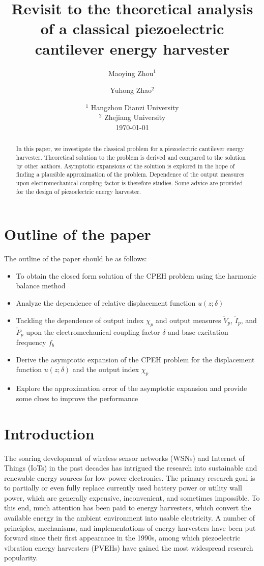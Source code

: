 \documentclass{article}
\title{Revisit to the theoretical analysis of a classical piezoelectric cantilever energy harvester}
\author{Maoying Zhou$^1$ \and Yuhong Zhao$^2$}
\date{%
    $^1$ Hangzhou Dianzi University\\%
    $^2$ Zhejiang University\\[2ex]%
    \today
}
\begin{document}
\maketitle


\begin{abstract}
 In this paper, we investigate the classical problem for a piezoelectric cantilever energy harvester. Theoretical solution to the problem is derived and compared to the solution by other authors. Asymptotic expansions of the solution is explored in the hope of finding a plausible approximation of the problem. Dependence of the output measures upon electromechanical coupling factor is therefore studies. Some advice are provided for the design of piezoelectric energy harvester.
\end{abstract}

\section{Outline of the paper}
The outline of the paper should be as follows:
\begin{itemize}
    \item To obtain the closed form solution of the CPEH problem using the harmonic balance method
    \item Analyze the dependence of relative displacement function $u(z;\delta)$
    \item Tackling the dependence of output index $\chi_p$ and output measures $\tilde{V}_p$, $\tilde{I}_p$, and $\tilde{P}_p$ upon the electromechanical coupling factor $\delta$ and base excitation frequency $f_b$
    \item Derive the asymptotic expansion of the CPEH problem for the displacement function $u(z;\delta)$ and the output index $\chi_p$
    \item Explore the approximation error of the asymptotic expansion and provide some clues to improve the performance
\end{itemize}


\section{Introduction}
 
The soaring development of wireless sensor networks (WSNs) and Internet of Things (IoTs) in the past decades has intrigued the research into sustainable and renewable energy sources for low-power electronics. The primary research goal is to partially or even fully replace currently used battery power or utility wall power, which are generally expensive, inconvenient, and sometimes impossible. To this end, much attention has been paid to energy harvesters, which convert the available energy in the ambient environment into usable electricity. A number of principles, mechanisms, and implementations of energy harvesters have been put forward since their first appearance in the 1990s, \cite{beeby2006energy,anton2007review,zhou2018review,safaei2019review} among which piezoelectric vibration energy harvesters (PVEHs) have gained the most widespread research popularity. 
\end{document}
